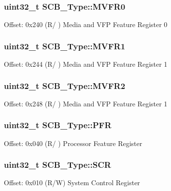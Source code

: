 \subsubsection[{\texorpdfstring{M\+V\+F\+R0}{MVFR0}}]{ uint32\+\_\+t S\+C\+B\+\_\+\+Type\+::\+M\+V\+F\+R0}\hypertarget{structSCB__Type_a658958c3e7cf9a0bb35c71853b2b6ea8}{}\label{structSCB__Type_a658958c3e7cf9a0bb35c71853b2b6ea8}
Offset\+: 0x240 (R/ ) Media and V\+FP Feature Register 0 
\subsubsection[{\texorpdfstring{M\+V\+F\+R1}{MVFR1}}]{ uint32\+\_\+t S\+C\+B\+\_\+\+Type\+::\+M\+V\+F\+R1}\hypertarget{structSCB__Type_a116ed13b1c1aba036b9307ed0ea55b47}{}\label{structSCB__Type_a116ed13b1c1aba036b9307ed0ea55b47}
Offset\+: 0x244 (R/ ) Media and V\+FP Feature Register 1 
\subsubsection[{\texorpdfstring{M\+V\+F\+R2}{MVFR2}}]{ uint32\+\_\+t S\+C\+B\+\_\+\+Type\+::\+M\+V\+F\+R2}\hypertarget{structSCB__Type_aed4b6e7df7dbef7bc468e6c857ef4204}{}\label{structSCB__Type_aed4b6e7df7dbef7bc468e6c857ef4204}
Offset\+: 0x248 (R/ ) Media and V\+FP Feature Register 1 
\subsubsection[{\texorpdfstring{P\+FR}{PFR}}]{ uint32\+\_\+t S\+C\+B\+\_\+\+Type\+::\+P\+FR}\hypertarget{structSCB__Type_aeb36c109d2fdb4eb4d6c4dc29154d77f}{}\label{structSCB__Type_aeb36c109d2fdb4eb4d6c4dc29154d77f}
Offset\+: 0x040 (R/ ) Processor Feature Register 
\subsubsection[{\texorpdfstring{S\+CR}{SCR}}]{ uint32\+\_\+t S\+C\+B\+\_\+\+Type\+::\+S\+CR}\hypertarget{structSCB__Type_abfad14e7b4534d73d329819625d77a16}{}\label{structSCB__Type_abfad14e7b4534d73d329819625d77a16}
Offset\+: 0x010 (R/W) System Control Register 
